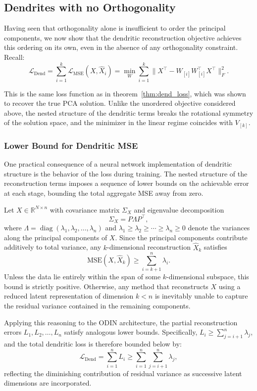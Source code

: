 \documentclass[twoside,11pt]{article}
\begin{document}
\subsection{Dendrites with no Orthogonality}
\label{subsec:with_dend}

Having seen that orthogonality alone is insufficient to order the principal components, we now show that the dendritic reconstruction objective achieves this ordering on its own, even in the absence of any orthogonality constraint. Recall: 
    \[\mathcal{L}_{\text{Dend}}= \sum_{i=1}^k\mathcal{L}_{\text{MSE}}(X,\hat{X}_i)= \min_W \sum_{i=1}^k \|X^\top-W_{[i]}W_{[i]}^\top X^\top\|_F^2.\]
    
This is the same loss function as in theorem~\ref{thm:dend_loss}, which was shown to recover the true PCA solution. Unlike the unordered objective considered above, the nested structure of the dendritic terms breaks the rotational symmetry of the solution space, and the minimizer in the linear regime coincides with $V_{[k]}$.

\subsubsection{Lower Bound for Dendritic MSE}

One practical consequence of a neural network implementation of dendritic structure is the behavior of the loss during training. The nested structure of the reconstruction terms imposes a sequence of lower bounds on the achievable error at each stage, bounding the total aggregate MSE away from zero.

Let $X \in \mathbb{R}^{N\times n}$ with covariance matrix $\Sigma_X$ and eigenvalue decomposition
\[
\Sigma_X = P \Lambda P^\top,
\]
where $\Lambda = \operatorname{diag}(\lambda_1, \lambda_2, \ldots, \lambda_n)$ and $\lambda_1 \geq \lambda_2 \geq \cdots \geq \lambda_n \geq 0$ denote the variances along the principal components of $X$. Since the principal components contribute additively to total variance, any $k$-dimensional reconstruction $\hat X_k$ satisfies
\[
\mathrm{MSE}(X, \hat{X}_k) \geq \sum_{i=k+1}^{n} \lambda_i.
\]
Unless the data lie entirely within the span of some $k$-dimensional subspace, this bound is strictly positive. Otherwise, any method that reconstructs $X$ using a reduced latent representation of dimension $k<n$ is inevitably unable to capture the residual variance contained in the remaining components.

Applying this reasoning to the ODIN architecture, the partial reconstruction errors $L_1, L_2, \ldots, L_n$ satisfy analogous lower bounds. Specifically, $L_i\geq \sum_{j=i+1}^n \lambda_j$, and the total dendritic loss is therefore bounded below by:
\[
\mathcal{L}_{\text{Dend}} = \sum_{i=1}^n L_i \geq \sum_{i=1}^n\sum_{j=i+1}^n \lambda_j,
\]
reflecting the diminishing contribution of residual variance as successive latent dimensions are incorporated.
\end{document}
